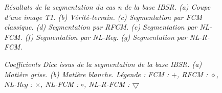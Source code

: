\begin{figure}[!thbp]
\begin{center}
        \end{center}

        \caption{\emph{Résultats de la segmentation du cas n de la base IBSR. (a) Coupe d'une image T1. (b) Vérité-terrain. (c) Segmentation par FCM classique. (d) Segmentation par RFCM. (e) Segmentation par NL-FCM. (f) Segmentation par NL-Reg. (g) Segmentation par NL-R-FCM.}}

        \label{FIG:DICE:IBSR}

\end{figure}

\begin{figure}[!thbp]

        \begin{center}
        \end{center}

        \caption{\emph{Coefficients Dice issus de la segmentation de la base IBSR. (a) Matière grise. (b) Matière blanche. Légende : FCM : $+$, RFCM : $\diamond$, NL-Reg : $\times$, NL-FCM : $\circ$, NL-R-FCM : $\bigtriangledown$}}

        \label{FIG:VIEW:IBSR}

\end{figure}

